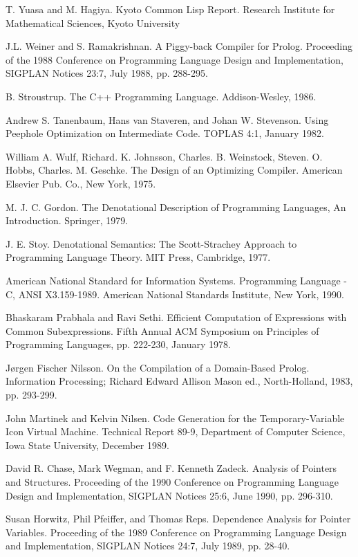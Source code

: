 \begin{noIndex}
\noindent
[Yuasa] T. Yuasa and M. Hagiya. Kyoto Common Lisp Report. Research
Institute for Mathematical Sciences, Kyoto University

\noindent
[Weiner] J.L. Weiner and S. Ramakrishnan. A Piggy-back Compiler for
Prolog. Proceeding of the 1988 Conference on Programming Language
Design and Implementation, SIGPLAN Notices 23:7, July 1988,
pp. 288-295.

\noindent
[Stroustrup 86] B. Stroustrup. The C++ Programming
Language. Addison-Wesley, 1986.

\noindent
[peephole] Andrew S. Tanenbaum, Hans van Staveren, and Johan
W. Stevenson. Using Peephole Optimization on Intermediate Code. TOPLAS
4:1, January 1982.

\noindent
[Wulf] William A. Wulf, Richard. K. Johnsson, Charles. B. Weinstock,
Steven. O. Hobbs, Charles. M. Geschke. The Design of an Optimizing
Compiler. American Elsevier Pub. Co., New York, 1975.

\noindent
[denote] M. J. C. Gordon. The Denotational Description of Programming
Languages, An Introduction. Springer, 1979.

\noindent
[Stoy] J. E. Stoy. Denotational Semantics: The Scott-Strachey Approach
to Programming Language Theory. MIT Press, Cambridge, 1977.

\noindent
[ansi-c] American National Standard for Information
Systems. Programming Language - C, ANSI X3.159-1989. American National
Standards Institute, New York, 1990.

\noindent
[Prabhala] Bhaskaram Prabhala and Ravi Sethi. Efficient Computation of
Expressions with Common Subexpressions. Fifth Annual ACM Symposium on
Principles of Programming Languages, pp. 222-230, January 1978.

\noindent
[Nilsson] J{\o}rgen Fischer Nilsson. On the Compilation of a
Domain-Based Prolog. Information Processing; Richard Edward Allison
Mason ed., North-Holland, 1983, pp. 293-299.

\noindent
[Martinek] John Martinek and Kelvin Nilsen. Code Generation for the
Temporary-Variable Icon Virtual Machine. Technical Report 89-9,
Department of Computer Science, Iowa State University, December 1989.

\noindent
[pntstr] David R. Chase, Mark Wegman, and F. Kenneth Zadeck. Analysis
of Pointers and Structures. Proceeding of the 1990 Conference on
Programming Language Design and Implementation, SIGPLAN Notices 25:6,
June 1990, pp. 296-310.

\noindent
[depptr] Susan Horwitz, Phil Pfeiffer, and Thomas Reps. Dependence
Analysis for Pointer Variables. Proceeding of the 1989 Conference on
Programming Language Design and Implementation, SIGPLAN Notices 24:7,
July 1989, pp. 28-40.


\end{noIndex}
